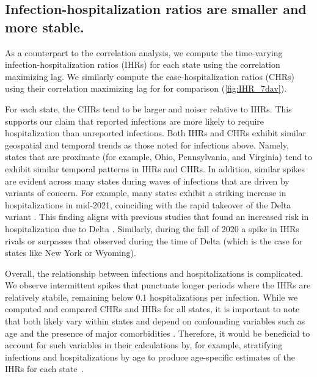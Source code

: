 \subsection{Infection-hospitalization ratios are smaller and more stable.}
\label{sec:ihrs}

As a counterpart to the correlation analysis, we compute the time-varying
infection-hospitalization ratios (IHRs) for each state using the correlation
maximizing lag. We similarly compute the case-hospitalization ratios (CHRs)
using their correlation maximizing lag for for comparison
(\autoref{fig:IHR_7dav}). 

For each state, the CHRs tend to be larger and noiser relative to IHRs. This
supports our claim that reported infections are more likely to require
hospitalization than unreported infections. Both IHRs and CHRs exhibit similar
geospatial and temporal trends as those noted for infections above. Namely,
states that are proximate (for example, Ohio, Pennsylvania, and Virginia) tend
to exhibit similar temporal patterns in IHRs and CHRs. In addition, similar
spikes are evident across many states during waves of infections that are driven
by variants of concern. For example, many states exhibit a striking increase in
hospitalizations in mid-2021, coinciding with the rapid takeover of the Delta
variant \citep{hodcroft2021covariants}. This finding aligns with previous
studies that found an increased risk in hospitalization due to Delta
\citep{twohig2022hospital, nyberg2022comparative}. Similarly, during the fall of
2020 a spike in IHRs rivals or surpasses that observed during the time of Delta
(which is the case for states like New York or Wyoming). 

Overall, the relationship between infections and hospitalizations is
complicated. We observe intermittent spikes that punctuate longer periods where
the IHRs are relatively stabile, remaining below 0.1 hospitalizations per
infection. 
While we computed and compared CHRs and IHRs for all states, it is important to
note that both likely vary within states and depend on confounding variables
such as age and the presence of major comorbidities
\citep{russell2023comorbidities}. Therefore, it would be beneficial to account
for such variables in their calculations by, for example, stratifying infections
and hospitalizations by age to produce age-specific estimates of the IHRs for
each state~\citep{fox2023disproportionate}.



